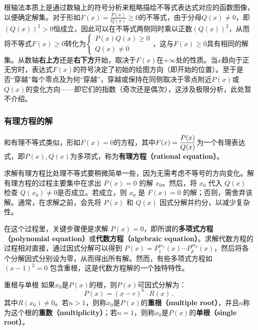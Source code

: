 根轴法本质上是通过数轴上的符号分析来粗略描绘不等式表达式对应的函数图像，以便确定解集。对于形如$\displaystyle F(x) = \frac{P(x)}{Q(x)} \geq 0$的不等式，由于分母$Q(x) \neq 0$，即$\left(Q(x)\right)^2 > 0$恒成立，因此可以在不等式两侧同时乘以正数$\left(Q(x)\right)^2$，从而将不等式$\displaystyle F(x) \geq 0$转化为$\displaystyle\begin{cases}P(x)Q(x) \geq 0 \\ Q(x) \neq 0\end{cases}$，这与$F(x) \geq 0$具有相同的解集。从数轴\textbf{右上方}还是\textbf{右下方}开始，取决于$F(x)$在$+\infty$处的性质。当$x$趋向于正无穷时，表达式$F(x)$的符号决定了初始的绘图方向（即开始的位置）。至于是否“穿越”每个零点及为何“穿越”，穿越或保持在同侧取决于零点附近$P(x)$或$Q(x)$的变化方向——即它们的指数（奇次还是偶次），这涉及极限分析，此处暂不介绍。

\subsubsection{有理方程的解}

和有理不等式类似，形如$F(x)=0$的方程，其中$\displaystyle F(x)={P(x)\over Q(x)}$为一个有理表达式，即$P(x),Q(x)$为多项式，称为\textbf{有理方程（rational equation）}。

求解有理方程比处理不等式要稍微简单一些，因为无需考虑不等号的方向变化。解有理方程的过程主要集中在求出 $P(x) = 0$ 的解 $x_0$。然后，将 $x_0$ 代入 $Q(x)$ 检查 $Q(x_0) \neq 0$是否成立。若成立，则 $x_0$ 是 $F(x) = 0$ 的解；否则，需舍弃该解。通常，在求解之前，会先将 $P(x)$ 和 $Q(x)$ 因式分解并约分，以减少复杂性。

在这个过程里，关键步骤便是求解 $P(x) = 0$，即所谓的\textbf{多项式方程（polynomial equation）}或\textbf{代数方程（algebraic equation）}。求解代数方程的过程相对直接，通过因式分解可以得到 $P(x) = P^{m_1}_1(x) \cdots P^{m_p}_p(x)$，然后将各个分解因式分别设为零，从而得出所有解。然而，有些多项式方程如 $(x - 1)^2 = 0$ 包含重根，这是代数方程解的一个独特特性。

\begin{definition}{重根与单根}
如果$x_0$是$P(x)$的根，则$P(x)$可因式分解为：
\begin{equation}
P(x) = (x - r)^n \cdot R(x)~.
\end{equation}
其中$R(x_0) \neq 0$。若$n>1$，则称$x_0$是$P(x)$的\textbf{重根（multiple root）}，并且$n$称为这个根的\textbf{重数（multiplicity）}；若$n=1$，则称$x_0$是$P(x)$的\textbf{单根（single root）}。
\end{definition}

